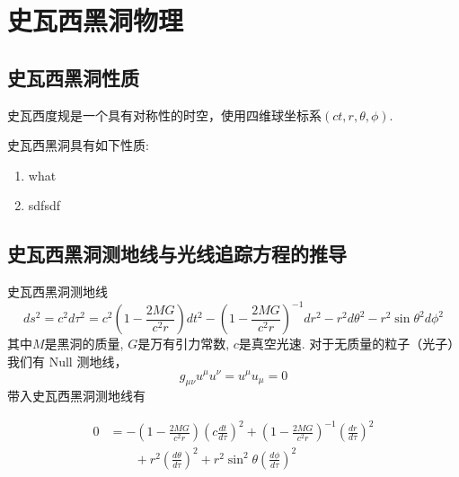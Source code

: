 %
%
%
%
%
%

\chapter{史瓦西黑洞物理}

\section{史瓦西黑洞性质}
史瓦西度规是一个具有对称性的时空，使用四维球坐标系$\left(ct,r,\theta,\phi\right)$.

史瓦西黑洞具有如下性质:
\begin{enumerate}
    
    \item what
    \item sdfsdf
\end{enumerate}


\section{史瓦西黑洞测地线与光线追踪方程的推导}

史瓦西黑洞测地线
\begin{equation}
    ds^{2}=c^{2}d\tau^{2}=c^{2}\left(1-\frac{2MG}{c^{2}r}\right)dt^{2}-\left(1-\frac{2MG}{c^{2}r}\right)^{-1}dr^{2}-r^{2}d\theta^{2}-r^{2}\sin\theta^{2}d\phi^{2}
\end{equation}
其中$M$是黑洞的质量, $G$是万有引力常数, $c$是真空光速.
对于无质量的粒子（光子）我们有 Null 测地线，
\begin{equation}
    g_{\mu\nu}u^{\mu}u^{\nu}=u^{\mu}u_{\mu}=0
\end{equation}
带入史瓦西黑洞测地线有

\begin{equation}
    \begin{split}
        0 & =-\left(1-\frac{2MG}{c^{2}r}\right)\left(c\frac{dt}{d\tau}\right)^{2}+\left(1-\frac{2MG}{c^{2}r}\right)^{-1}\left(\frac{dr}{d\tau}\right)^{2}\\
        & \qquad+r^{2}\left(\frac{d\theta}{d\tau}\right)^{2}+r^{2}\sin^{2}\theta\left(\frac{d\phi}{d\tau}\right)^{2}
    \end{split}
\end{equation}

